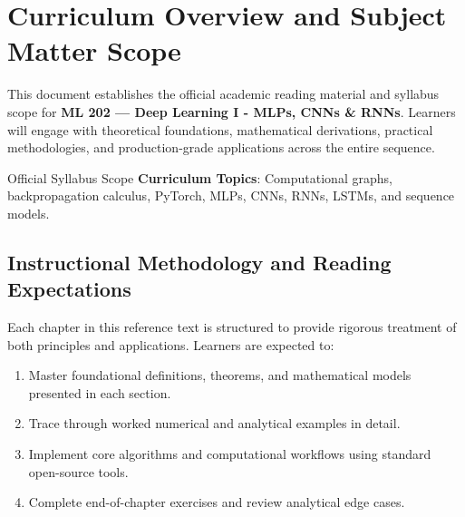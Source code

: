 \section{Curriculum Overview and Subject Matter Scope}

This document establishes the official academic reading material and syllabus scope for \textbf{ML 202 --- Deep Learning I - MLPs, CNNs \& RNNs}. Learners will engage with theoretical foundations, mathematical derivations, practical methodologies, and production-grade applications across the entire sequence.

\begin{InsightBox}{Official Syllabus Scope}
  \textbf{Curriculum Topics}: Computational graphs, backpropagation calculus, PyTorch, MLPs, CNNs, RNNs, LSTMs, and sequence models.
\end{InsightBox}

\subsection{Instructional Methodology and Reading Expectations}

Each chapter in this reference text is structured to provide rigorous treatment of both principles and applications. Learners are expected to:
\begin{enumerate}
  \item Master foundational definitions, theorems, and mathematical models presented in each section.
  \item Trace through worked numerical and analytical examples in detail.
  \item Implement core algorithms and computational workflows using standard open-source tools.
  \item Complete end-of-chapter exercises and review analytical edge cases.
\end{enumerate}

